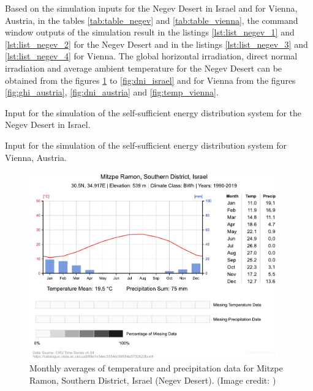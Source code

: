 Based on the simulation inputs for the Negev Desert in Israel and for Vienna, Austria, in the tables \ref{tab:table_negev} and \ref{tab:table_vienna}, the command window outputs of the \MATLAB simulation result in the listings \ref{lst:list_negev_1} and \ref{lst:list_negev_2} for the Negev Desert and in the listings \ref{lst:list_negev_3} and \ref{lst:list_negev_4} for Vienna. The global horizontal irradiation, direct normal irradiation and average ambient temperature for the Negev Desert can be obtained from the figures \ref{fig:temp_negev} to \ref{fig:dni_israel} and for Vienna from the figures \ref{fig:ghi_austria}, \ref{fig:dni_austria} and \ref{fig:temp_vienna}. %
\begin{table}[h!]
	\centering
	
	\caption{Input for the \MATLAB simulation of the self-sufficient energy distribution system for the Negev Desert in Israel.}
	\label{tab:table_negev}
\end{table}
\begin{table}[h!]
	\centering
	
	\caption{Input for the \MATLAB simulation of the self-sufficient energy distribution system for Vienna, Austria.}
	\label{tab:table_vienna}
\end{table}
\begin{figure}[h!]
	\centering
  	\includegraphics[width = 0.96\textwidth]{temp_maps/temp_negev}
  	\caption{Monthly averages of temperature and precipitation data for Mitzpe Ramon, Southern District, Israel (Negev Desert). (Image credit: \cite{Zepner:2020})}
	\label{fig:temp_negev}
\end{figure}

